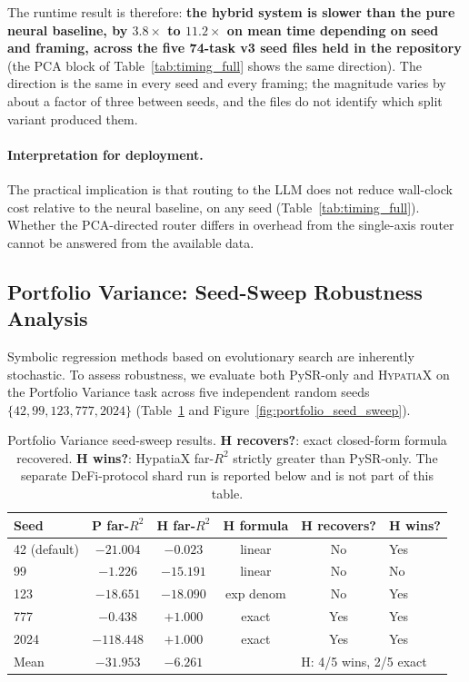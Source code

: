 \documentclass[twoside,11pt]{article}
\newcommand{\Rsq}{R^{2}}
\begin{document}
The runtime result is therefore: \textbf{the hybrid system
is slower than the pure neural baseline, by $3.8\times$ to $11.2\times$ on mean
time depending on seed and framing, across the five 74-task v3 seed files
held in the repository} (the PCA block of Table~\ref{tab:timing_full} shows the
same direction). The direction is the same in every seed and every
framing; the magnitude varies by about a factor of three between seeds, and
the files do not identify which split variant produced them.

\paragraph{Interpretation for deployment.}
The practical implication is that routing to the LLM does not reduce wall-clock cost relative to the neural baseline, on any seed (Table~\ref{tab:timing_full}). Whether the
PCA-directed router differs in overhead from the single-axis router cannot be
answered from the available data.


\subsection{Portfolio Variance: Seed-Sweep Robustness Analysis}\label{subsec:portfolio-variance-seedsweep-robustness-}
\label{sec:portfolio_seed_sweep}

Symbolic regression methods based on evolutionary search are inherently stochastic.
To assess robustness, we evaluate both PySR-only and \textsc{HypatiaX} on the
Portfolio Variance task across five independent random seeds
$\{42, 99, 123, 777, 2024\}$ (Table~\ref{tab:portfolio_seed_sweep} and
Figure~\ref{fig:portfolio_seed_sweep}).

\begin{table}[h]
\centering
\caption{Portfolio Variance seed-sweep results.
  \textbf{H recovers?}: exact closed-form formula recovered.
  \textbf{H wins?}: HypatiaX far-$\Rsq$ strictly greater than PySR-only.
  The separate DeFi-protocol
  shard run is reported below and is not part of this table.}
\label{tab:portfolio_seed_sweep}
\small
\begin{tabular}{lccccl}
\toprule
\textbf{Seed} & \textbf{P far-$\Rsq$} & \textbf{H far-$\Rsq$} &
\textbf{H formula} & \textbf{H recovers?} & \textbf{H wins?} \\
\midrule
42 (default) & $-21.004$ & $-0.023$  & linear    & No  & Yes \\
99           & $-1.226$  & $-15.191$ & linear    & No  & No  \\
123          & $-18.651$ & $-18.090$ & exp denom & No  & Yes \\
777          & $-0.438$  & $+1.000$  & exact     & Yes & Yes \\
2024         & $-118.448$ & $+1.000$  & exact     & Yes & Yes \\
\midrule
Mean         & $-31.953$ & $-6.261$  &           & \multicolumn{2}{l}{H: 4/5 wins, 2/5 exact} \\
\bottomrule
\end{tabular}
\end{table}
\end{document}
